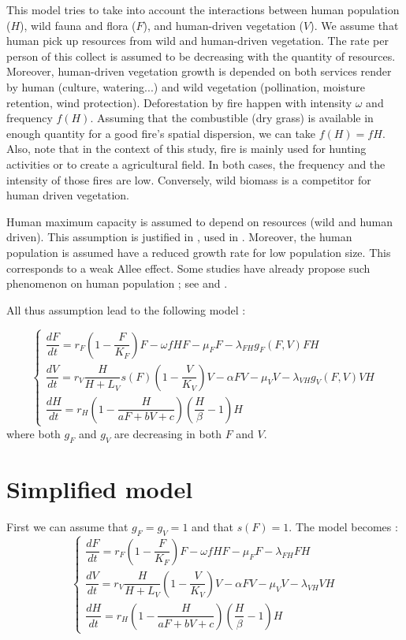 \documentclass{article}
\newcommand{\lf}{\lambda_{FH}}
\newcommand{\lv}{\lambda_{VH}}
\begin{document}
\newpage

This model tries to take into account the interactions between human population ($H$), wild fauna and flora ($F$), and human-driven vegetation ($V$). 
We assume that human pick up resources from wild and human-driven vegetation. The rate per person of this collect is assumed to be decreasing with the quantity of resources.
Moreover, human-driven vegetation growth is depended on both services render by human (culture, watering...) and wild vegetation (pollination, moisture retention, wind protection). 
Deforestation by fire happen with intensity $\omega$ and frequency $f(H)$. Assuming that the combustible (dry grass) is available in enough quantity for a good fire's spatial dispersion, we can take $f(H) = fH$. Also, note that in the context of this study, fire is mainly used for hunting activities or to create a agricultural field. In both cases, the frequency and the intensity of those fires are low.
Conversely, wild biomass is a competitor for human driven vegetation.

Human maximum capacity is assumed to depend on resources (wild and human driven). This assumption is justified in \cite{fanta_equilibrium_2018}, used in \cite{bengochea_paz_agricultural_2020}.
Moreover, the human population is assumed have a reduced growth rate for low population size. This corresponds to a weak Allee effect. Some studies have already propose such phenomenon on human population ; see \cite{hamilton_human_2012} and \cite{vaesen_inbreeding_2019}.

All thus assumption lead to the following model :

\begin{equation}    
\left\{ \begin{array}{l}
\dfrac{dF}{dt}=r_{F}\left(1-\dfrac{F}{K_{F}}\right)F-\omega f H F - \mu_F F -\lambda_{FH}g_F(F,V)F H \\
\dfrac{dV}{dt}=r_V \dfrac{H}{H + L_V} s(F) \left(1-\dfrac{V}{K_{V}}\right)V -\alpha FV-\mu_V V -\lambda_{VH} g_V(F,V) V H\\
\dfrac{dH}{dt}=r_H \left(1-\dfrac{H}{aF + bV + c} \right) (\dfrac{H}{\beta} - 1) H
\end{array}\right.
\label{model}
\end{equation}
where both $g_F$ and $g_V$ are decreasing in both $F$ and $V$.

\section{Simplified model}
First we can assume that $g_F = g_V = 1$ and that $s(F) = 1$. The model becomes :
\begin{equation}    
\left\{ \begin{array}{l}
\dfrac{dF}{dt}=r_{F}\left(1-\dfrac{F}{K_{F}}\right)F-\omega f H F - \mu_F F -\lf F H \\
\dfrac{dV}{dt}=r_V \dfrac{H}{H + L_V} \left(1-\dfrac{V}{K_{V}}\right)V -\alpha FV-\mu_V V -\lv V H\\
\dfrac{dH}{dt}=r_H \left(1-\dfrac{H}{aF + bV + c} \right)  (\dfrac{H}{\beta} - 1) H
\end{array}\right.
\label{model:simplified}
\end{equation}
\end{document}
